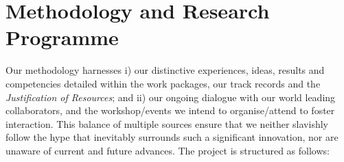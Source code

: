 \documentclass[a4paper,11pt]{article}
\begin{document}



\vspace*{-0.2in}

\section{Methodology and Research Programme}
\vspace*{-0.1in}

Our methodology harnesses i) our distinctive
experiences, ideas, results and
competencies detailed within the work packages, our track records and the {\em
  Justification of Resources}; and 
ii) our ongoing dialogue with our
world leading collaborators, and the workshop/events we intend to
organise/attend to foster interaction. This balance of multiple sources ensure that we neither
slavishly follow the hype that inevitably surrounds such a significant
innovation, nor are unaware of current and future advances. The
project is structured as follows:


\end{document}
